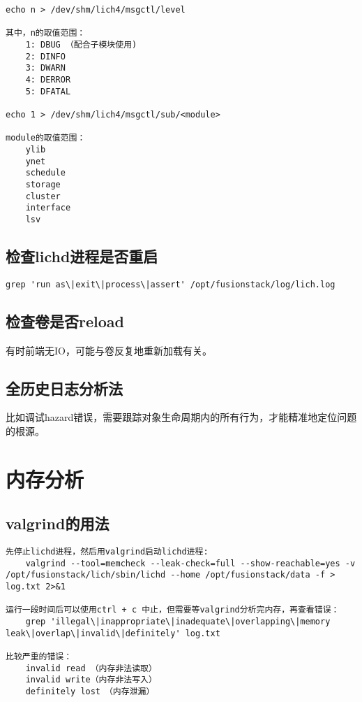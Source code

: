 \begin{lstlisting}
echo n > /dev/shm/lich4/msgctl/level

其中，n的取值范围：
    1: DBUG （配合子模块使用)
    2: DINFO
    3: DWARN
    4: DERROR
    5: DFATAL

echo 1 > /dev/shm/lich4/msgctl/sub/<module>

module的取值范围：
    ylib
    ynet
    schedule
    storage
    cluster
    interface
    lsv
\end{lstlisting}


\subsection{检查lichd进程是否重启}


\begin{lstlisting}
grep 'run as\|exit\|process\|assert' /opt/fusionstack/log/lich.log
\end{lstlisting}

\subsection{检查卷是否reload}

有时前端无IO，可能与卷反复地重新加载有关。

\subsection{全历史日志分析法}

比如调试hazard错误，需要跟踪对象生命周期内的所有行为，才能精准地定位问题的根源。

\section{内存分析}

\subsection{valgrind的用法}

\begin{lstlisting}
先停止lichd进程，然后用valgrind启动lichd进程:
    valgrind --tool=memcheck --leak-check=full --show-reachable=yes -v /opt/fusionstack/lich/sbin/lichd --home /opt/fusionstack/data -f > log.txt 2>&1

运行一段时间后可以使用ctrl + c 中止，但需要等valgrind分析完内存，再查看错误：
    grep 'illegal\|inappropriate\|inadequate\|overlapping\|memory leak\|overlap\|invalid\|definitely' log.txt

比较严重的错误：　　　
    invalid read （内存非法读取）
    invalid write（内存非法写入）
    definitely lost　（内存泄漏）
\end{lstlisting}

